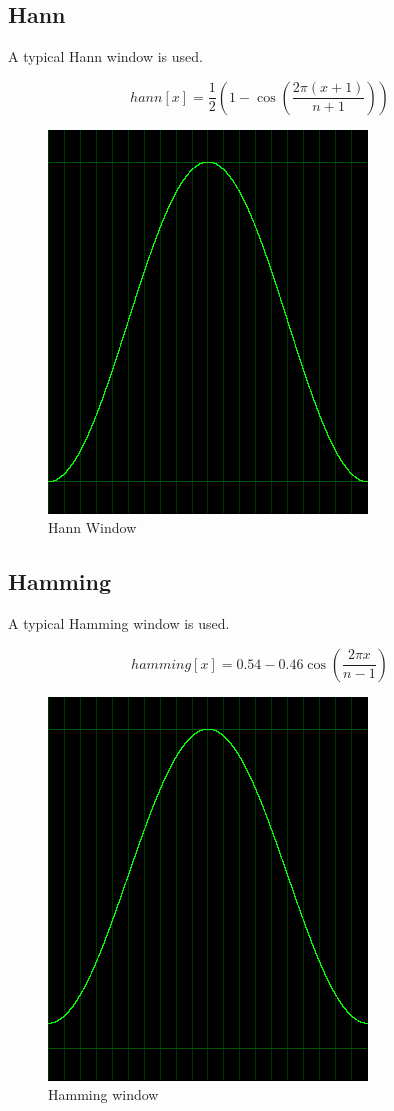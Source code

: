\documentclass[10pt,a4paper]{report}
\begin{document}
\subsection{Hann}
A typical Hann window is used.

\begin{equation}
hann[x] = \frac{1}{2}(1 - \cos(\frac{2\pi(x+1)}{n+1}))
\end{equation}

\begin{figure}[H]
	\centering
	\includegraphics[width=0.4\linewidth]{plots/window-hann.png}
	\caption[Hann Window]{Hann Window}
	\label{fig:window-hann}
\end{figure}


\subsection{Hamming}
A typical Hamming window is used.

\begin{equation}
hamming[x] = 0.54 - 0.46\cos(\frac{2\pi x}{n-1})
\end{equation}

\begin{figure}[H]
	\centering
	\includegraphics[width=0.4\linewidth]{plots/window-hamming.png}
	\caption[Hamming window]{Hamming window}
	\label{fig:window-hamming}
\end{figure}
\end{document}
